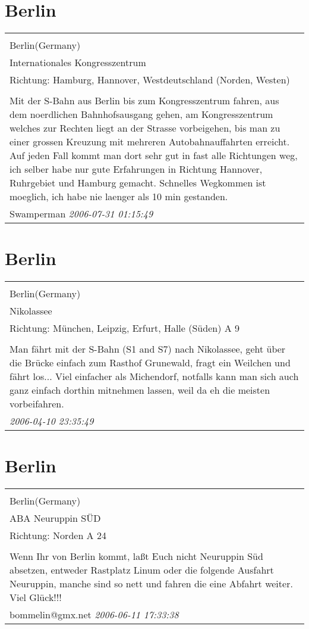 \documentclass[a4paper,12pt]{article}
\begin{document}
\section{Berlin}
\begin{tabular}{|p{13cm}|}
\hline\\
Berlin(Germany)\\
Internationales Kongresszentrum\\
Richtung: Hamburg, Hannover, Westdeutschland (Norden, Westen) \\
\hline\\
Mit der S-Bahn aus Berlin bis zum Kongresszentrum fahren, aus dem noerdlichen Bahnhofsausgang gehen, am Kongresszentrum welches zur Rechten liegt an der Strasse vorbeigehen, bis man zu einer grossen Kreuzung mit mehreren Autobahnauffahrten erreicht. Auf jeden Fall kommt man dort sehr gut in fast alle Richtungen weg, ich selber habe nur gute Erfahrungen in Richtung Hannover, Ruhrgebiet und Hamburg gemacht. Schnelles Wegkommen ist moeglich, ich habe nie laenger als 10 min gestanden. \\
Swamperman \textit{ 2006-07-31 01:15:49 }\\\hline
\end{tabular}


\section{Berlin}
\begin{tabular}{|p{13cm}|}
\hline\\
Berlin(Germany)\\
Nikolassee\\
Richtung: München, Leipzig, Erfurt, Halle (Süden) A 9 \\
\hline\\
Man fährt mit der S-Bahn (S1 and S7) nach Nikolassee, geht über die Brücke einfach zum Rasthof Grunewald, fragt ein Weilchen und fährt los...
Viel einfacher als Michendorf, notfalls kann man sich auch ganz einfach dorthin mitnehmen lassen, weil da eh die meisten vorbeifahren. \\
\textit{ 2006-04-10 23:35:49 }\\\hline
\end{tabular}


\section{Berlin}
\begin{tabular}{|p{13cm}|}
\hline\\
Berlin(Germany)\\
ABA Neuruppin SÜD\\
Richtung: Norden A 24 \\
\hline\\
Wenn Ihr von Berlin kommt, laßt Euch nicht Neuruppin Süd absetzen, entweder Rastplatz Linum oder die folgende Ausfahrt Neuruppin, manche sind so nett und fahren die eine Abfahrt weiter. Viel Glück!!! \\
bommelin@gmx.net \textit{ 2006-06-11 17:33:38 }\\\hline
\end{tabular}
\end{document}
